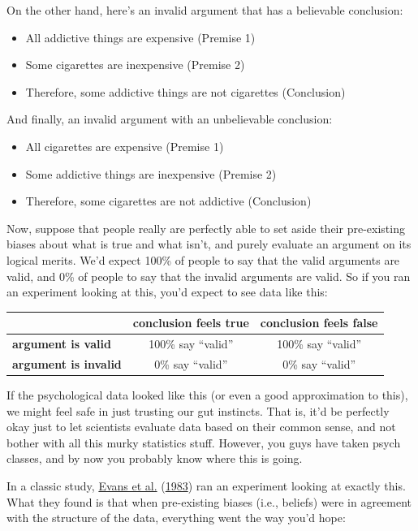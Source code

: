\documentclass[
]{book}
\providecommand{\tightlist}{%
  \setlength{\itemsep}{0pt}\setlength{\parskip}{0pt}}
\begin{document}
On the other hand, here's an invalid argument that has a believable conclusion:

\begin{itemize}
\tightlist
\item
  All addictive things are expensive (Premise 1)
\item
  Some cigarettes are inexpensive (Premise 2)
\item
  Therefore, some addictive things are not cigarettes (Conclusion)
\end{itemize}

And finally, an invalid argument with an unbelievable conclusion:

\begin{itemize}
\tightlist
\item
  All cigarettes are expensive (Premise 1)
\item
  Some addictive things are inexpensive (Premise 2)
\item
  Therefore, some cigarettes are not addictive (Conclusion)
\end{itemize}

Now, suppose that people really are perfectly able to set aside their pre-existing biases about what is true and what isn't, and purely evaluate an argument on its logical merits. We'd expect 100\% of people to say that the valid arguments are valid, and 0\% of people to say that the invalid arguments are valid. So if you ran an experiment looking at this, you'd expect to see data like this:

\begin{longtable}[]{@{}lcc@{}}
\toprule
& conclusion feels true & conclusion feels false\tabularnewline
\midrule
\endhead
\textbf{argument is valid} & 100\% say ``valid'' & 100\% say ``valid''\tabularnewline
\textbf{argument is invalid} & 0\% say ``valid'' & 0\% say ``valid''\tabularnewline
\bottomrule
\end{longtable}

If the psychological data looked like this (or even a good approximation to this), we might feel safe in just trusting our gut instincts. That is, it'd be perfectly okay just to let scientists evaluate data based on their common sense, and not bother with all this murky statistics stuff. However, you guys have taken psych classes, and by now you probably know where this is going.

In a classic study, \protect\hyperlink{ref-Evans1983}{Evans et al.} (\protect\hyperlink{ref-Evans1983}{1983}) ran an experiment looking at exactly this. What they found is that when pre-existing biases (i.e., beliefs) were in agreement with the structure of the data, everything went the way you'd hope:
\end{document}
